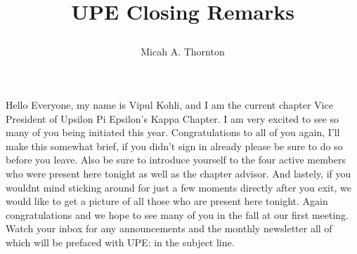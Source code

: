 \title{UPE Closing Remarks\author{Micah A. Thornton}}

Hello Everyone, my name is Vipul Kohli, and I am the current chapter Vice President of Upsilon Pi Epsilon's Kappa Chapter. I am very excited to see so many of you being initiated this year. Congratulations to all of you again, I'll make this somewhat brief, if you didn't sign in already please be sure to do so before you leave. Also be sure to introduce yourself to the four active members who were present here tonight as well as the chapter advisor. And lastely, if you wouldnt mind sticking around for just a few moments directly after you exit, we would like to get a picture of all those who are present here tonight. Again congratulations and we hope to see many of you in the fall at our first meeting. Watch your inbox for any announcements and the monthly newsletter all of which will be prefaced with UPE: in the subject line.

